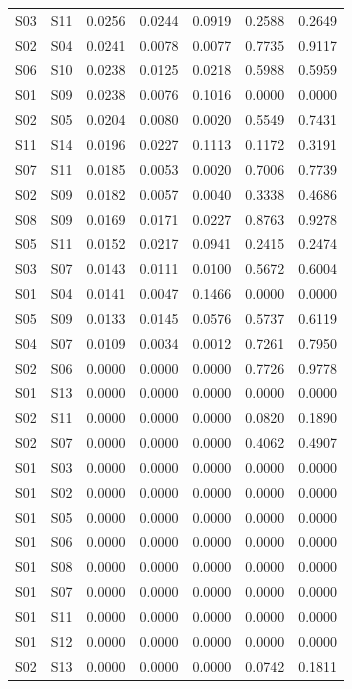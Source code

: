 \begin{table}
\begin{tabular}{llrrrrr}
S03 & S11 & 0.0256 & 0.0244 & 0.0919 & 0.2588 & 0.2649 \\
S02 & S04 & 0.0241 & 0.0078 & 0.0077 & 0.7735 & 0.9117 \\
S06 & S10 & 0.0238 & 0.0125 & 0.0218 & 0.5988 & 0.5959 \\
S01 & S09 & 0.0238 & 0.0076 & 0.1016 & 0.0000 & 0.0000 \\
S02 & S05 & 0.0204 & 0.0080 & 0.0020 & 0.5549 & 0.7431 \\
S11 & S14 & 0.0196 & 0.0227 & 0.1113 & 0.1172 & 0.3191 \\
S07 & S11 & 0.0185 & 0.0053 & 0.0020 & 0.7006 & 0.7739 \\
S02 & S09 & 0.0182 & 0.0057 & 0.0040 & 0.3338 & 0.4686 \\
S08 & S09 & 0.0169 & 0.0171 & 0.0227 & 0.8763 & 0.9278 \\
S05 & S11 & 0.0152 & 0.0217 & 0.0941 & 0.2415 & 0.2474 \\
S03 & S07 & 0.0143 & 0.0111 & 0.0100 & 0.5672 & 0.6004 \\
S01 & S04 & 0.0141 & 0.0047 & 0.1466 & 0.0000 & 0.0000 \\
S05 & S09 & 0.0133 & 0.0145 & 0.0576 & 0.5737 & 0.6119 \\
S04 & S07 & 0.0109 & 0.0034 & 0.0012 & 0.7261 & 0.7950 \\
S02 & S06 & 0.0000 & 0.0000 & 0.0000 & 0.7726 & 0.9778 \\
S01 & S13 & 0.0000 & 0.0000 & 0.0000 & 0.0000 & 0.0000 \\
S02 & S11 & 0.0000 & 0.0000 & 0.0000 & 0.0820 & 0.1890 \\
S02 & S07 & 0.0000 & 0.0000 & 0.0000 & 0.4062 & 0.4907 \\
S01 & S03 & 0.0000 & 0.0000 & 0.0000 & 0.0000 & 0.0000 \\
S01 & S02 & 0.0000 & 0.0000 & 0.0000 & 0.0000 & 0.0000 \\
S01 & S05 & 0.0000 & 0.0000 & 0.0000 & 0.0000 & 0.0000 \\
S01 & S06 & 0.0000 & 0.0000 & 0.0000 & 0.0000 & 0.0000 \\
S01 & S08 & 0.0000 & 0.0000 & 0.0000 & 0.0000 & 0.0000 \\
S01 & S07 & 0.0000 & 0.0000 & 0.0000 & 0.0000 & 0.0000 \\
S01 & S11 & 0.0000 & 0.0000 & 0.0000 & 0.0000 & 0.0000 \\
S01 & S12 & 0.0000 & 0.0000 & 0.0000 & 0.0000 & 0.0000 \\
S02 & S13 & 0.0000 & 0.0000 & 0.0000 & 0.0742 & 0.1811 \\

\end{tabular}
\end{table}
